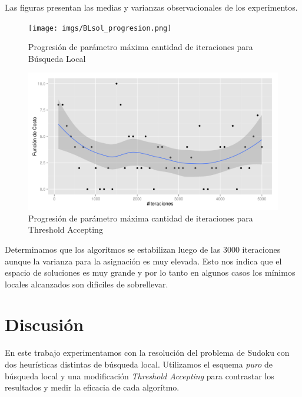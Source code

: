 \documentclass[a4paper,spanish]{article}
\begin{document}
Las figuras presentan las medias y varianzas observacionales de los
experimentos.


\begin{center}
    \begin{figure}[H]
        \texttt{[image: imgs/BLsol\_progresion.png]}
        \caption{Progresión de parámetro máxima cantidad de iteraciones para Búsqueda Local}
        \label{img:prog_ls}
    \end{figure}
\end{center}


\begin{center}
    \begin{figure}[H]
        \includegraphics[width=\textwidth]{imgs/TAsol_progresion.png}
        \caption{Progresión de parámetro máxima cantidad de iteraciones para
        Threshold Accepting}
        \label{img:prog_ta}
    \end{figure}
\end{center}

Determinamos que los algorítmos se estabilizan luego de las 3000 iteraciones
aunque la varianza para la asignación es muy elevada. Esto nos indica que el
espacio de soluciones es muy grande y por lo tanto en algunos casos los mínimos locales
alcanzados son dificiles de sobrellevar.



\section{Discusión}

En este trabajo experimentamos con la resolución del problema de Sudoku con dos
heurísticas distintas de búsqueda local. Utilizamos el esquema \textit{puro} de
búsqueda local y una modificación \emph{Threshold Accepting} para contrastar los
resultados y medir la eficacia de cada algorítmo.
\end{document}
